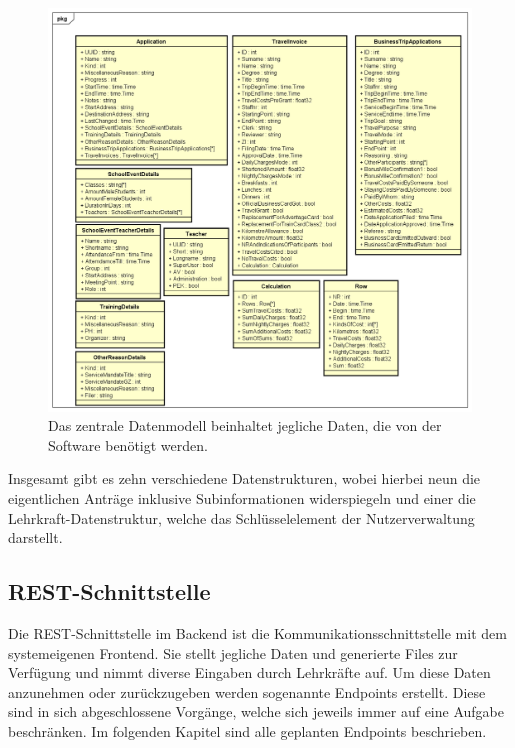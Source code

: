 \begin{figure}[H]
	\centering
	\includegraphics[width=\linewidth]{images/mbeier_konzept/Datamodel}
	\caption[Zentrales Datenmodell]{Das zentrale Datenmodell beinhaltet jegliche Daten, die von der Software benötigt werden.}
	\label{fig:datamodel}
\end{figure}

Insgesamt gibt es zehn verschiedene Datenstrukturen, wobei hierbei neun die eigentlichen Anträge inklusive Subinformationen widerspiegeln und einer die Lehrkraft-Datenstruktur, welche das Schlüsselelement der Nutzerverwaltung darstellt.

\newpage

\subsection{REST-Schnittstelle}

Die REST-Schnittstelle im Backend ist die Kommunikationsschnittstelle mit dem systemeigenen Frontend. Sie stellt jegliche Daten und generierte Files zur Verfügung und nimmt diverse Eingaben durch Lehrkräfte auf. Um diese Daten anzunehmen oder zurückzugeben werden sogenannte Endpoints erstellt. Diese sind in sich abgeschlossene Vorgänge, welche sich jeweils immer auf eine Aufgabe beschränken. Im folgenden Kapitel sind alle geplanten Endpoints beschrieben.

